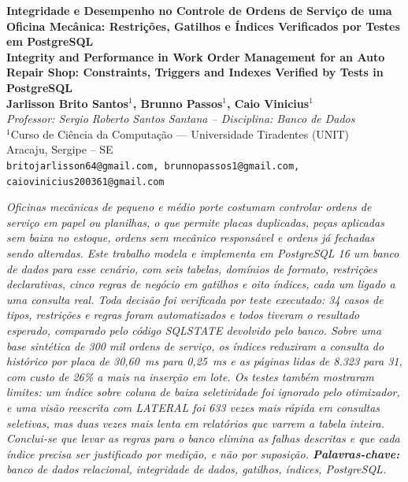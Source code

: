 \documentclass[a4paper,12pt]{article}
\newenvironment{resumo}{%
  \list{}{\advance\topsep by6pt\relax
    \leftmargin=0.8cm
    \labelwidth=0pt
    \listparindent=0pt
    \itemindent\listparindent
    \rightmargin\leftmargin}\item[\hskip\labelsep\bfseries\itshape Resumo.]\itshape}%
  {\endlist}
\begin{document}
\pagestyle{empty}
\sloppy

\begin{center}
  {\fontsize{16}{20}\selectfont\bfseries Integridade e Desempenho no Controle de Ordens de Serviço de uma Oficina Mecânica: Restrições, Gatilhos e Índices Verificados por Testes em PostgreSQL}\\[4pt]
  {\fontsize{14}{18}\selectfont\bfseries Integrity and Performance in Work Order Management for an Auto Repair Shop: Constraints, Triggers and Indexes Verified by Tests in PostgreSQL}\\[12pt]

  {\normalsize\bfseries Jarlisson Brito Santos$^{1}$, Brunno Passos$^{1}$, Caio Vinicius$^{1}$}\\[4pt]
  {\footnotesize\itshape Professor: Sergio Roberto Santos Santana -- Disciplina: Banco de Dados}\\[6pt]

  {\normalsize
    $^{1}$Curso de Ciência da Computação — Universidade Tiradentes (UNIT)\\{}
    Aracaju, Sergipe -- SE\\{}
    \footnotesize\texttt{britojarlisson64@gmail.com, brunnopassos1@gmail.com, caiovinicius200361@gmail.com}
  }
\end{center}
\vspace{12pt}

\begin{resumo}
Oficinas mecânicas de pequeno e médio porte costumam controlar ordens de
serviço em papel ou planilhas, o que permite placas duplicadas, peças
aplicadas sem baixa no estoque, ordens sem mecânico responsável e ordens
já fechadas sendo alteradas. Este trabalho modela e implementa em
PostgreSQL 16 um banco de dados para esse cenário, com seis tabelas,
domínios de formato, restrições declarativas, cinco regras de negócio
em gatilhos e oito índices, cada um ligado a uma consulta real. Toda
decisão foi verificada por teste executado: 34 casos de tipos,
restrições e regras foram automatizados e todos tiveram o resultado
esperado, comparado pelo código SQLSTATE devolvido pelo banco. Sobre uma
base sintética de 300 mil ordens de serviço, os índices reduziram a
consulta do histórico por placa de 30,60~ms para 0,25~ms e as páginas
lidas de 8.323 para 31, com custo de 26\% a mais na inserção em lote. Os
testes também mostraram limites: um índice sobre coluna de baixa
seletividade foi ignorado pelo otimizador, e uma visão reescrita com
\emph{LATERAL} foi 633 vezes mais rápida em consultas seletivas, mas
duas vezes mais lenta em relatórios que varrem a tabela inteira. Conclui-se
que levar as regras para o banco elimina as falhas descritas e que cada
índice precisa ser justificado por medição, e não por suposição.
\end{resumo}
\noindent\textbf{Palavras-chave:} banco de dados relacional, integridade de dados, gatilhos, índices, PostgreSQL.
\end{document}
